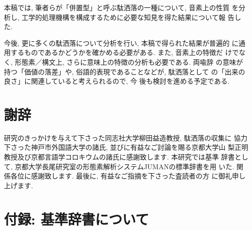 本稿では, 筆者らが「併置型」と呼ぶ駄洒落の一種について, 音素上の性質
を分析し, 工学的処理機構を構成するために必要な知見を得た結果について報
告した.  

今後, 更に多くの駄洒落について分析を行い, 本稿で得られた結果が普遍的
に通用するものであるかどうかを確かめる必要がある. また, 音素上の特徴だ
けでなく, 形態素／構文上, さらに意味上の特徴の分析も必要である. 両喩辞
の意味が持つ「価値の落差」や, 俗語的表現であることなどが, 駄洒落として
の「出来の良さ」に関連していると考えられるので\cite{Takizawa1992}, 今
後も検討を進める予定である. 

\section*{謝辞}

  研究のきっかけを与えて下さった同志社大学柳田益造教授, 駄洒落の収集に
協力下さった神戸市外国語大学の諸氏, 並びに有益なご討論を賜る京都大学山
梨正明教授及び京都言語学コロキウムの諸氏に感謝致します. 本研究では基準
辞書として, 京都大学長尾研究室の形態素解析システムJUMANの標準辞書を用
いた. 関係各位に感謝致します. 最後に, 有益なご指摘を下さった査読者の方
に御礼申し上げます.  


\section*{付録: 基準辞書について}

